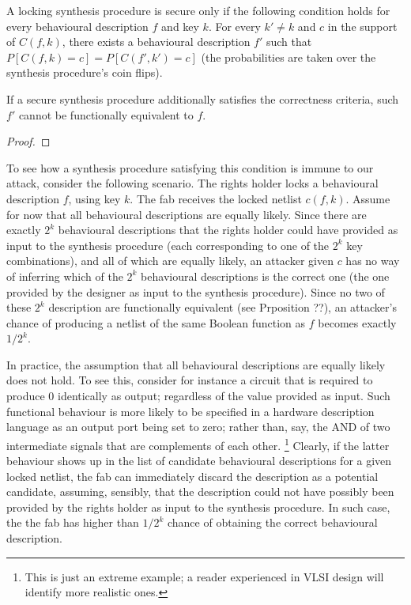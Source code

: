\begin{definition}
A locking synthesis procedure is secure only if the following condition holds for every behavioural description $f$ and key $k$. For every $k'\neq k$ and $c$ in the support of $C(f,k)$, there exists a behavioural description $f'$ such that
$P[C(f,k)=c]= P[C(f',k')=c]$
(the probabilities are taken over the synthesis procedure's coin flips).

\begin{proposition}
If a secure synthesis procedure additionally satisfies the correctness criteria, such $f'$ cannot be functionally equivalent to $f$.
\end{proposition}
\begin{proof}
\end{proof}

To see how a synthesis procedure satisfying this condition is immune to our attack, consider the following scenario. The rights holder locks a behavioural description $f$, using key $k$. The fab receives the locked netlist $c(f,k)$. Assume for now that all behavioural descriptions are equally likely. Since there are exactly $2^k$ behavioural descriptions that the rights holder could have provided as input to the synthesis procedure (each corresponding to one of the $2^k$ key combinations), and all of which are equally likely, an attacker given $c$ has no way of inferring which of the $2^k$ behavioural descriptions is the correct one (the one provided by the designer as input to the synthesis procedure). Since no two of these $2^k$ description are functionally equivalent (see Prposition ??), an attacker's chance of producing a netlist of the same Boolean function as $f$ becomes exactly $1/{2^k}$.

In practice, the assumption that all behavioural descriptions are equally likely does not hold. To see this, consider for instance a circuit that is required to produce $0$ identically as output; regardless of the value provided as input. Such functional behaviour is more likely to be specified in a hardware description language as an output port being set to zero; rather than, say, the AND of two intermediate signals that are complements of each other. \footnote{This is just an extreme example; a reader experienced in VLSI design will identify more realistic ones.} Clearly, if the latter behaviour shows up in the list of candidate behavioural descriptions for a given locked netlist, the fab can immediately discard the description as a potential candidate, assuming, sensibly, that the description could not have possibly been provided by the rights holder as input to the synthesis procedure. In such case, the 
the fab has higher than $1/{2^k}$ chance of obtaining the correct behavioural description.


\end{definition}
